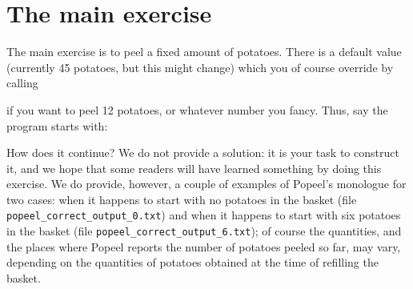 \documentclass[12pt]{article}
\begin{document}
\section{The main exercise}

The main exercise is to peel a fixed amount of potatoes.
There is a default value (currently 45 potatoes, but 
this might change) which you of course override by
calling


if you want to peel 12 potatoes, or whatever number
you fancy. Thus, say the program starts with:




How does it continue? We do not provide a solution:
it is your task to construct it, and we hope that
some readers will have learned something by doing
this exercise. We do provide, however, a couple of
examples of Popeel's monologue for two cases:
when it happens to start with no potatoes in the
basket (file {\tt popeel_correct_output_0.txt})
and when it happens to start with six potatoes in the
basket (file {\tt popeel_correct_output_6.txt});
of course the quantities, and the places where
Popeel reports the number of potatoes peeled so far,
may vary, depending on the quantities of potatoes
obtained at the time of refilling the basket.


\end{document}
